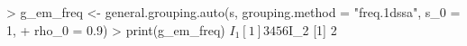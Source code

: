 \begin{CodeChunk}
\begin{CodeInput}


> g_em_freq <- general.grouping.auto(s, grouping.method = "freq.1dssa", s_0 = 1, 
+                                  rho_0 = 0.9)
> print(g_em_freq)
$I_1
[1] 3 4 5 6
$I_2
[1] 2
\end{CodeInput}

\end{CodeChunk}